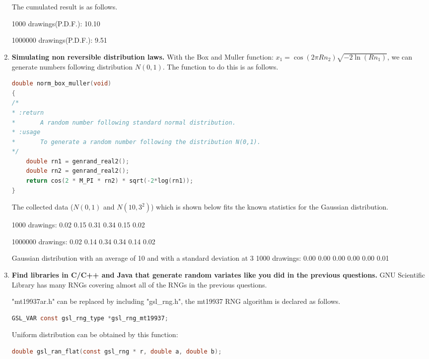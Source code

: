 \documentclass{article}
\begin{document}
\begin{enumerate}
The cumulated result is as follows.
\begin{messageshell}

1000 drawings(P.D.F.):
10.10%

1000000 drawings(P.D.F.):
9.51%
\end{messageshell}
\item{\textbf{Simulating non reversible distribution laws.}}
With the Box and Muller function: $x_1=\cos(2\pi Rn_2)\sqrt{-2\ln(Rn_1)}$, we can generate numbers following distribution $N(0,1)$. The function to do this is as follows.
\begin{lstlisting}[language=C]
double norm_box_muller(void)
{
/*
* :return  
*       A random number following standard normal distribution.
* :usage
*       To generate a random number following the distribution N(0,1).
*/
    double rn1 = genrand_real2();
    double rn2 = genrand_real2();
    return cos(2 * M_PI * rn2) * sqrt(-2*log(rn1));
}  
\end{lstlisting}

The collected data ($N(0,1)$ and $N(10,3^2)$) which is shown below fits the known statistics for the Gaussian distribution.

\begin{messageshell}

1000 drawings:
0.02 0.15 0.31 0.34 0.15 0.02

1000000 drawings:
0.02 0.14 0.34 0.34 0.14 0.02

Gaussian distribution with an average of 10 and with a standard deviation at 3
1000 drawings:
0.00 0.00 0.00 0.00 0.00 0.01
\end{messageshell}
\item{\textbf{Find libraries in C/C++ and Java that generate random variates like you did in the previous questions.}}
GNU Scientific Library has many RNGs covering almost all of the RNGs in the previous questions.

"mt19937ar.h" can be replaced by including "gsl\_rng.h", the mt19937 RNG algorithm is declared as follows.
\begin{lstlisting}[language=C]
GSL_VAR const gsl_rng_type *gsl_rng_mt19937;
\end{lstlisting}

Uniform distribution can be obtained by this function:
\begin{lstlisting}[language=C]
double gsl_ran_flat(const gsl_rng * r, double a, double b);
\end{lstlisting}


\end{enumerate}
\end{document}
